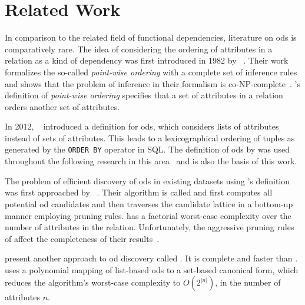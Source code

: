 
\section{Related Work}\label{sec:related_work}

In comparison to the related field of functional dependencies, literature on \glspl{od} is comparatively rare.
The idea of considering the ordering of attributes in a relation as a kind of dependency was first introduced in 1982 by \citeauthor{ginsburg}~\cite{ginsburg}.
Their work formalizes the so-called \textit{point-wise ordering} with a complete set of inference rules and shows that the problem of inference in their formalism is co-NP-complete~\cite{ginsburg}.
\citeauthor{ginsburg}'s definition of \textit{point-wise ordering} specifies that a set of attributes in a relation orders another set of attributes.

In 2012, \citeauthor{szlichta:fundamentals}~\cite{szlichta:fundamentals} introduced a definition for \glspl{od}, which considers lists of attributes instead of sets of attributes.
This leads to a lexicographical ordering of tuples as generated by the \texttt{ORDER BY} operator in SQL.
The definition of \glspl{od} by \citeauthor{szlichta:fundamentals} was used throughout the following research in this area~\cite{consonni, langer, szlichta:discovery} and is also the basis of this work.

The problem of efficient discovery of \glspl{od} in existing datasets using \citeauthor{szlichta:fundamentals}'s definition was first approached by \citeauthor{langer}~\cite{langer}.
Their algorithm is called \order{} and first computes all potential \gls{od} candidates and then traverses the candidate lattice in a bottom-up manner employing pruning rules.
\order{} has a factorial worst-case complexity over the number of attributes in the relation.
Unfortunately, the aggressive pruning rules of \order{} affect the completeness of their results~\cite{szlichta:discovery}.

\citeauthor{szlichta:discovery} present another approach to \gls{od} discovery called \fastod{}.
It is complete and faster than \order{}.
\fastod{} uses a polynomial mapping of list-based \glspl{od} to a set-based canonical form, which reduces the algorithm's worst-case complexity to $O(2^{\left|n\right|})$, in the number of attributes $n$.

